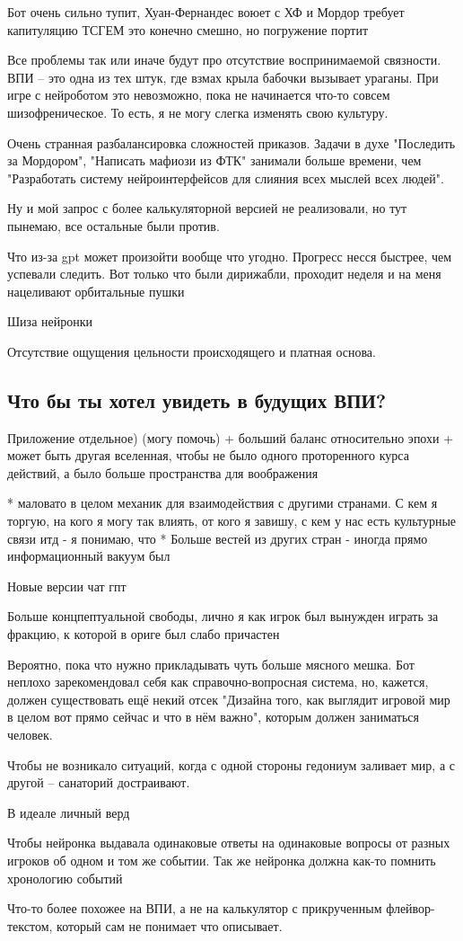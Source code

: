 Бот очень сильно тупит, Хуан-Фернандес воюет с ХФ и Мордор требует капитуляцию ТСГЕМ это конечно смешно, но погружение портит

Все проблемы так или иначе будут про отсутствие воспринимаемой связности. ВПИ -- это одна из тех штук, где взмах крыла бабочки вызывает ураганы. При игре с нейроботом это невозможно, пока не начинается что-то совсем шизофреническое. То есть, я не могу слегка изменять свою культуру.

Очень странная разбалансировка сложностей приказов. Задачи в духе "Последить за Мордором", "Написать мафиози из ФТК" занимали больше времени, чем "Разработать систему нейроинтерфейсов для слияния всех мыслей всех людей".

Ну и мой запрос с более калькуляторной версией не реализовали, но тут пынемаю, все остальные были против.

Что из-за gpt может произойти вообще что угодно. Прогресс несся быстрее, чем успевали следить. Вот только что были дирижабли, проходит неделя и на меня нацеливают орбитальные пушки

Шиза нейронки

Отсутствие ощущения цельности происходящего и платная основа.

\subsection{Что бы ты хотел увидеть в будущих ВПИ?}
Приложение отдельное) (могу помочь)
+ больший баланс относительно эпохи
+ может быть другая вселенная, чтобы не было одного проторенного курса действий, а было больше пространства для воображения

* маловато в целом механик для взаимодействия с другими странами. С кем я торгую, на кого я могу так влиять, от кого я завишу, с кем у нас есть культурные связи итд - я понимаю, что
* Больше вестей из других стран - иногда прямо информационный вакуум был

Новые версии чат гпт

Больше концпептуальной свободы, лично я как игрок был вынужден играть за фракцию, к которой в ориге был слабо причастен

Вероятно, пока что нужно прикладывать чуть больше мясного мешка. Бот неплохо зарекомендовал себя как справочно-вопросная система, но, кажется, должен существовать ещё некий отсек "Дизайна того, как выглядит игровой мир в целом вот прямо сейчас и что в нём важно", которым должен заниматься человек.

Чтобы не возникало ситуаций, когда с одной стороны гедониум заливает мир, а с другой -- санаторий достраивают.

В идеале личный верд

Чтобы нейронка выдавала одинаковые ответы на одинаковые вопросы от разных игроков об одном и том же событии. Так же нейронка должна как-то помнить хронологию событий

Что-то более похожее на ВПИ, а не на калькулятор с прикрученным флейвор-текстом, который сам не понимает что описывает.